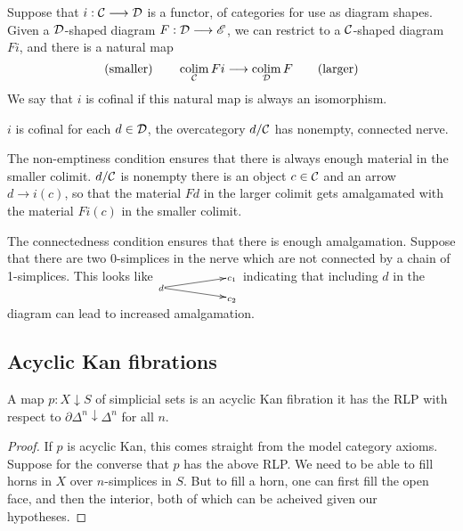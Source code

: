\documentclass[11pt]{article}
\newcommand{\myheading}[1]
{{\noindent\Large #1}

}
\renewcommand{\myheading}[1]{\subsection{#1}}
\begin{document}
\begin{Cofinal functors}
Suppose that $i:\mathcal{C}\longrightarrow\mathcal{D}$ is a functor, of categories for use as diagram shapes. Given a $\mathcal{D}$-shaped diagram $F:\mathcal{D}\longrightarrow\mathscr{E}$, we can restrict to a $\mathcal{C}$-shaped diagram $Fi$, and there is a natural map
\[\textup{(smaller)\qquad }\operatorname*{colim}_{\mathcal{C}} Fi\longrightarrow\operatorname*{colim}_{\mathcal{D}} F\textup{\qquad (larger)}\]
We say that $i$ is cofinal if this natural map is always an isomorphism.
\begin{thm*}
$i$ is cofinal \Iff for each $d\in\mathcal{D}$, the overcategory $d/\mathcal{C}$ has nonempty, connected nerve.
\end{thm*}
\begin{itemise}
\setlength{\parindent}{.25in}
\item The non-emptiness condition ensures that there is always enough material in the smaller colimit. $d/\mathcal{C}$ is nonempty \Iff there is an object $c\in\mathcal{C}$ and an arrow $d\to i(c)$, so that the material $Fd$ in the larger colimit gets amalgamated with the material $Fi(c)$ in the smaller colimit.
\item The connectedness condition ensures that there is enough amalgamation. Suppose that there are two 0-simplices in the nerve which are not connected by a chain of 1-simplices. This looks like
${
\def\objectstyle{\scriptstyle}
\xymatrix@R=3mm@C=2cm@!0@1{
&%
c_1 \\%
d
\ar[ur]
\ar[dr]
&%
\\%
&%
c_2 %
}}$
indicating that including $d$ in the diagram can lead to increased amalgamation.
\end{itemise}
\end{Cofinal functors}
\myheading{Acyclic Kan fibrations}
\begin{Acyclic Kan fibrations}
\begin{thm*}
A map $p:X\downarrow S$ of simplicial sets is an acyclic Kan fibration \Iff it has the RLP with respect to $\partial\Delta^n\downarrow\Delta^n$ for all $n$.
\end{thm*}
\begin{proof}
If $p$ is acyclic Kan, this comes straight from the model category axioms. Suppose for the converse that $p$ has the above RLP. We need to be able to fill horns in $X$ over $n$-simplices in $S$. But to fill a horn, one can first fill the open face, and then the interior, both of which can be acheived given our hypotheses.
\end{proof}
\end{Acyclic Kan fibrations}
\end{document}
